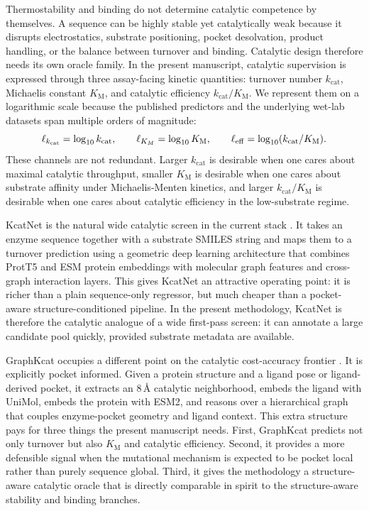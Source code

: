 \documentclass[11pt]{article}
\newcommand{\angstrom}{\ensuremath{\text{\AA}}}
\newcommand{\kcat}{\ensuremath{k_{\mathrm{cat}}}}
\newcommand{\Km}{\ensuremath{K_{\mathrm M}}}
\newcommand{\kcatKm}{\ensuremath{k_{\mathrm{cat}}/K_{\mathrm M}}}
\newcommand{\logkcat}{\ensuremath{\log_{10} k_{\mathrm{cat}}}}
\newcommand{\logKm}{\ensuremath{\log_{10} K_{\mathrm M}}}
\newcommand{\logeff}{\ensuremath{\log_{10}(k_{\mathrm{cat}}/K_{\mathrm M})}}
\begin{document}
	Thermostability and binding do not determine catalytic competence by themselves. A sequence can be highly stable yet catalytically weak because it disrupts electrostatics, substrate positioning, pocket desolvation, product handling, or the balance between turnover and binding. Catalytic design therefore needs its own oracle family. In the present manuscript, catalytic supervision is expressed through three assay-facing kinetic quantities: turnover number $\kcat$, Michaelis constant $\Km$, and catalytic efficiency $\kcatKm$. We represent them on a logarithmic scale because the published predictors and the underlying wet-lab datasets span multiple orders of magnitude:
	\begin{equation}
		\ell_{k_{\rm cat}}=\logkcat,\qquad
		\ell_{K_M}=\logKm,\qquad
		\ell_{\mathrm{eff}}=\logeff.
	\end{equation}
	These channels are not redundant. Larger $\kcat$ is desirable when one cares about maximal catalytic throughput, smaller $\Km$ is desirable when one cares about substrate affinity under Michaelis-Menten kinetics, and larger $\kcatKm$ is desirable when one cares about catalytic efficiency in the low-substrate regime.
	
	KcatNet is the natural wide catalytic screen in the current stack \citep{pan2026kcatnet}. It takes an enzyme sequence together with a substrate SMILES string and maps them to a turnover prediction using a geometric deep learning architecture that combines ProtT5 and ESM protein embeddings with molecular graph features and cross-graph interaction layers. This gives KcatNet an attractive operating point: it is richer than a plain sequence-only regressor, but much cheaper than a pocket-aware structure-conditioned pipeline. In the present methodology, KcatNet is therefore the catalytic analogue of a wide first-pass screen: it can annotate a large candidate pool quickly, provided substrate metadata are available.
	
	GraphKcat occupies a different point on the catalytic cost-accuracy frontier \citep{luo2025graphkcat}. It is explicitly pocket informed. Given a protein structure and a ligand pose or ligand-derived pocket, it extracts an $8\,\angstrom$ catalytic neighborhood, embeds the ligand with UniMol, embeds the protein with ESM2, and reasons over a hierarchical graph that couples enzyme-pocket geometry and ligand context. This extra structure pays for three things the present manuscript needs. First, GraphKcat predicts not only turnover but also $\Km$ and catalytic efficiency. Second, it provides a more defensible signal when the mutational mechanism is expected to be pocket local rather than purely sequence global. Third, it gives the methodology a structure-aware catalytic oracle that is directly comparable in spirit to the structure-aware stability and binding branches.
	
\end{document}
